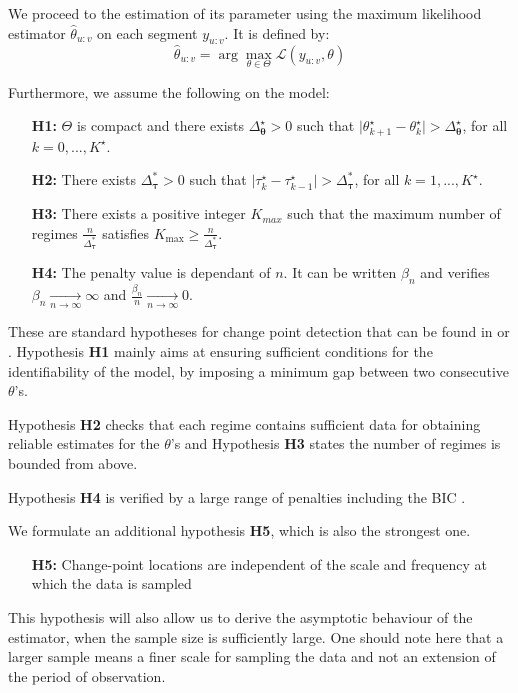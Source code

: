 We proceed to the estimation of its parameter using the maximum likelihood estimator $\widehat{\theta}_{u:v}$ on each segment $y_{u:v}$. It is defined by:
\begin{equation}\label{chp:4:emv}
\widehat{\theta}_{u:v} = \arg\max_{\theta \in \Theta}\mathcal{L}(y_{u:v},\theta)
\end{equation}

Furthermore, we assume the following on the model:  
\begin{itemize}
\item[\textbf{H1:}] $\Theta$ is compact and there exists $\Delta_{\bm \theta}^{\star}>0$ such that $\vert \theta_{k+1}^{\star}-\theta_{k}^{\star}\vert > \Delta_{\bm \theta}^{\star}$, for all $k=0,...,K^{\star}$.
\item[\textbf{H2:}] There exists $\Delta_{\bm \tau}^*>0$ such that $\vert \tau_{k}^{\star}-\tau_{k-1}^{\star}\vert > \Delta^*_{\bm \tau}$, for all $k=1,...,K^{\star}$.
\item[\textbf{H3:}]  There exists a positive integer $K_{max}$ such that the maximum number of regimes $\frac{n}{\Delta^*_{\bm \tau}}$ satisfies $K_{\max} \geq \frac{n}{\Delta^*_{\bm \tau}}$. 
\item[\textbf{H4:}] The penalty value is dependant of $n$. It can be written $\beta_{n}$ and verifies $\beta_{n}\xrightarrow[n\rightarrow \infty]{} \infty$ and $\frac{\beta_{n}}{n}\xrightarrow[n\rightarrow \infty]{} 0$.
\end{itemize}

These are standard hypotheses for change point detection that can be found in \cite{Lavielle1997} or \cite{He2010}. Hypothesis \textbf{H1} mainly aims at ensuring sufficient conditions for the identifiability of the model, by imposing a minimum gap between two consecutive $\theta$'s. 

Hypothesis \textbf{H2} checks that each regime contains sufficient data for obtaining reliable estimates for the $\theta$'s and Hypothesis \textbf{H3} states the number of regimes is bounded from above.  

Hypothesis \textbf{H4} is verified by a large range of penalties including the BIC \citep{YAO1988181}. 

We formulate an additional hypothesis \textbf{H5}, which is also the strongest one. 
\begin{itemize}
\item[\textbf{H5:}] Change-point locations are independent of the scale and frequency at which the data is sampled
\end{itemize}
This hypothesis will also allow us to derive the asymptotic behaviour of the estimator, when the sample size is sufficiently large. One should note here that a larger sample means a finer scale for sampling the data and not an extension of the period of observation. 

